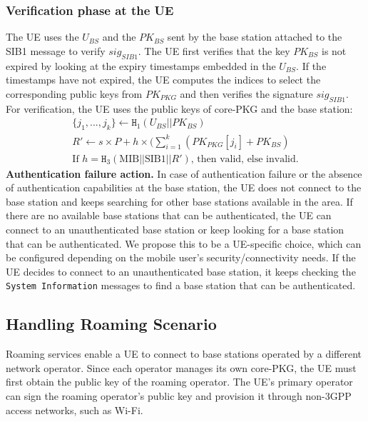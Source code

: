 \subsubsection{Verification phase at the UE} 
The UE uses the $U_{BS}$ and the $PK_{BS}$ sent by the base station attached to the SIB1 message to verify $sig_{SIB1}$. The UE first verifies that the key $PK_{BS}$ is not expired by looking at the expiry timestamps embedded in the $U_{BS}$. If the timestamps have not expired, the UE computes the indices to select the corresponding public keys from $PK_{PKG}$ and then verifies the signature $sig_{SIB1}$.
For verification, the UE uses the public keys of core-PKG and the base station: 
\begin{gather*}
\{j_1,...,j_{k}\} \gets \mathtt{H}_1(U_{BS}||PK_{BS})\\
R' \gets s \times P + h \times (\sum^{k}_{i=1}(PK_{PKG}[j_i] + PK_{BS})\\
\text{If } h = \mathtt{H}_3(\text{MIB}||\text{SIB1}||R') \text{, then valid, else invalid.}
\end{gather*}
\noindent \textbf{Authentication failure action.} In case of authentication failure or the absence of authentication capabilities at the base station, the UE does not connect to the base station and keeps searching for other base stations available in the area. If there are no available base stations that can be authenticated, the UE can connect to an unauthenticated base station or keep looking for a base station that can be authenticated. We propose this to be a UE-specific choice, which can be configured depending on the mobile user's security/connectivity needs. If the UE decides to connect to an unauthenticated base station, it keeps checking the \texttt{System Information} messages to find a base station that can be authenticated.

\subsection{Handling Roaming Scenario}
\label{roaming}
Roaming services enable a UE to connect to base stations operated by a different network operator. Since each operator manages its own core-PKG, the UE must first obtain the public key of the roaming operator. The UE's primary operator can sign the roaming operator’s public key and provision it through non-3GPP access networks, such as Wi-Fi.

